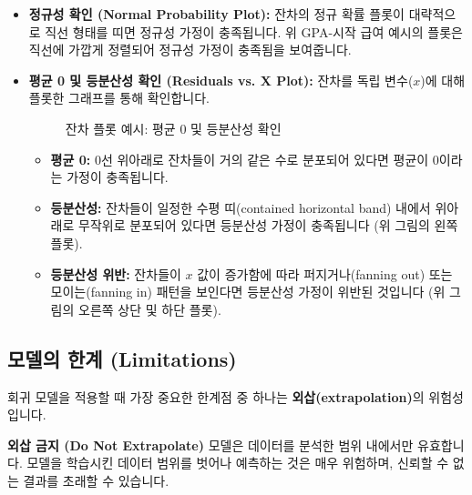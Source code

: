 \documentclass[11pt,a4paper]{book}
\theoremstyle{definition}
\begin{document}
\begin{itemize}
    \item \textbf{정규성 확인 (Normal Probability Plot):}
    잔차의 정규 확률 플롯이 대략적으로 직선 형태를 띠면 정규성 가정이 충족됩니다. 위 GPA-시작 급여 예시의 플롯은 직선에 가깝게 정렬되어 정규성 가정이 충족됨을 보여줍니다.

    \item \textbf{평균 0 및 등분산성 확인 (Residuals vs. X Plot):}
    잔차를 독립 변수($x$)에 대해 플롯한 그래프를 통해 확인합니다.
    \begin{figure}[h!]
        \centering
        \caption{잔차 플롯 예시: 평균 0 및 등분산성 확인}
        \label{fig:residual_plots_good_bad}
    \end{figure}
    \begin{tcolorbox}[colback=lightblue,colframe=darkblue,title={평균 0 및 등분산성 가정 확인}]
    \begin{itemize}
        \item \textbf{평균 0:} 0선 위아래로 잔차들이 거의 같은 수로 분포되어 있다면 평균이 0이라는 가정이 충족됩니다.
        \item \textbf{등분산성:} 잔차들이 일정한 수평 띠(contained horizontal band) 내에서 위아래로 무작위로 분포되어 있다면 등분산성 가정이 충족됩니다 (위 그림의 왼쪽 플롯).
        \item \textbf{등분산성 위반:} 잔차들이 $x$ 값이 증가함에 따라 퍼지거나(fanning out) 또는 모이는(fanning in) 패턴을 보인다면 등분산성 가정이 위반된 것입니다 (위 그림의 오른쪽 상단 및 하단 플롯).
    \end{itemize}
    \end{tcolorbox}
\end{itemize}

\subsection{모델의 한계 (Limitations)}
회귀 모델을 적용할 때 가장 중요한 한계점 중 하나는 \textbf{외삽(extrapolation)}의 위험성입니다.

\begin{cautionbox}
\textbf{외삽 금지 (Do Not Extrapolate)}
모델은 데이터를 분석한 범위 내에서만 유효합니다. 모델을 학습시킨 데이터 범위를 벗어나 예측하는 것은 매우 위험하며, 신뢰할 수 없는 결과를 초래할 수 있습니다.
\end{cautionbox}
\end{document}
